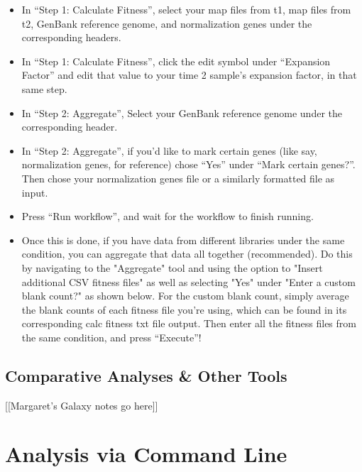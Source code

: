 \documentclass{article}
\begin{document}
\vspace{5 mm}

\begin{itemize}
\item In “Step 1: Calculate Fitness”, select your map files from t1, map files from t2, GenBank reference genome, and normalization genes under the corresponding headers. 
\item In “Step 1: Calculate Fitness”, click the edit symbol under “Expansion Factor” and edit that value to your time 2 sample’s expansion factor, in that same step.
\item In “Step 2: Aggregate”, Select your GenBank reference genome under the corresponding header.
\item In “Step 2: Aggregate”, if you’d like to mark certain genes (like say, normalization genes, for reference) chose “Yes” under “Mark certain genes?”. Then chose your normalization genes file or a similarly formatted file as input.
\item Press “Run workflow”, and wait for the workflow to finish running.
\item Once this is done, if you have data from different libraries under the same condition, you can aggregate that data all together (recommended). Do this by navigating to the "Aggregate" tool and using the option to "Insert additional CSV fitness files" as well as selecting "Yes" under "Enter a custom blank count?" as shown below. For the custom blank count, simply average the blank counts of each fitness file you're using, which can be found in its corresponding calc fitness txt file output. Then enter all the fitness files from the same condition, and press “Execute”!

\end{itemize}

\newpage

\subsection{Comparative Analyses \& Other Tools}
\label{subsec:comparative}

[[Margaret's Galaxy notes go here]]

\newpage

\section{Analysis via Command Line}
\label{sec:command}

\vspace{2 mm}
\end{document}
